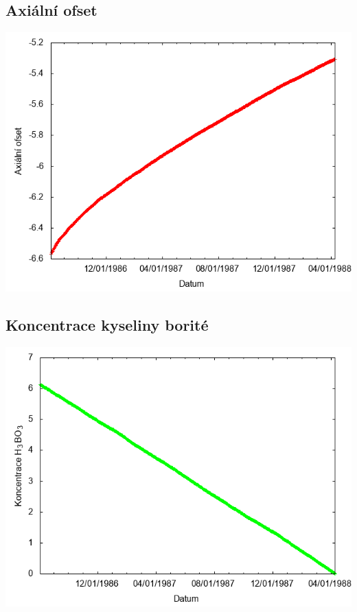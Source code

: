 \documentclass[a4paper,twoside,11pt]{article}
\begin{document}
\subsection*{Axiální ofset}
\begin{center}
\includegraphics[width=.8\textwidth]{graphs/Disneyland_15_ao.png}
\end{center}

\subsection*{Koncentrace kyseliny borité}
\begin{center}
\includegraphics[width=.8\textwidth]{graphs/Disneyland_15_bc.png}
\end{center}
\end{document}
